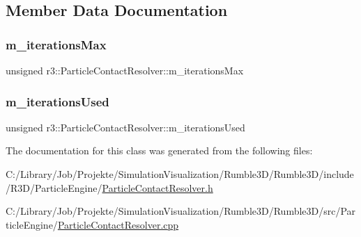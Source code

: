\subsection{Member Data Documentation}
\mbox{\label{classr3_1_1_particle_contact_resolver_a4533db9c8dc455ad5b8c8f9e37db5392}} 
\subsubsection{\texorpdfstring{m\+\_\+iterations\+Max}{m\_iterationsMax}}
{\footnotesize\ttfamily unsigned r3\+::\+Particle\+Contact\+Resolver\+::m\+\_\+iterations\+Max\hspace{0.3cm}{\ttfamily [protected]}}

\mbox{\label{classr3_1_1_particle_contact_resolver_a07536069a9a6a73c45794baf8579b845}} 
\subsubsection{\texorpdfstring{m\+\_\+iterations\+Used}{m\_iterationsUsed}}
{\footnotesize\ttfamily unsigned r3\+::\+Particle\+Contact\+Resolver\+::m\+\_\+iterations\+Used\hspace{0.3cm}{\ttfamily [protected]}}



The documentation for this class was generated from the following files\+:\begin{DoxyCompactItemize}
\item 
C\+:/\+Library/\+Job/\+Projekte/\+Simulation\+Visualization/\+Rumble3\+D/\+Rumble3\+D/include/\+R3\+D/\+Particle\+Engine/\mbox{\hyperlink{_particle_contact_resolver_8h}{Particle\+Contact\+Resolver.\+h}}\item 
C\+:/\+Library/\+Job/\+Projekte/\+Simulation\+Visualization/\+Rumble3\+D/\+Rumble3\+D/src/\+Particle\+Engine/\mbox{\hyperlink{_particle_contact_resolver_8cpp}{Particle\+Contact\+Resolver.\+cpp}}\end{DoxyCompactItemize}
